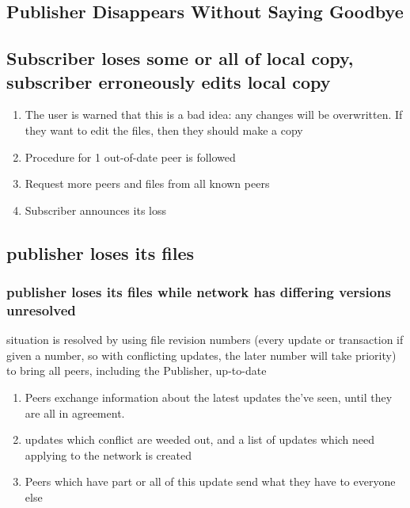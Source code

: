 \documentclass[12pt,a4paper,]{adreport}
\begin{document}
\subsection{Publisher Disappears Without Saying
Goodbye}\label{publisher-disappears-without-saying-goodbye}

\subsection{Subscriber loses some or all of local copy, subscriber
erroneously edits local
copy}\label{subscriber-loses-some-or-all-of-local-copy-subscriber-erroneously-edits-local-copy}

\begin{enumerate}
\def\labelenumi{\arabic{enumi}.}
\itemsep1pt\parskip0pt
\item
  The user is warned that this is a bad idea: any changes will be
  overwritten. If they want to edit the files, then they should make a
  copy
\item
  Procedure for 1 out-of-date peer is followed
\item
  Request more peers and files from all known peers
\item
  Subscriber announces its loss
\end{enumerate}

\subsection{publisher loses its files}\label{publisher-loses-its-files}

\subsubsection{publisher loses its files while network has differing
versions
unresolved}\label{publisher-loses-its-files-while-network-has-differing-versions-unresolved}

situation is resolved by using file revision numbers (every update or
transaction if given a number, so with conflicting updates, the later
number will take priority) to bring all peers, including the Publisher,
up-to-date

\begin{enumerate}
\def\labelenumi{\arabic{enumi}.}
\itemsep1pt\parskip0pt
\item
  Peers exchange information about the latest updates the've seen, until
  they are all in agreement.
\item
  updates which conflict are weeded out, and a list of updates which
  need applying to the network is created
\item
  Peers which have part or all of this update send what they have to
  everyone else
\end{enumerate}
\end{document}
